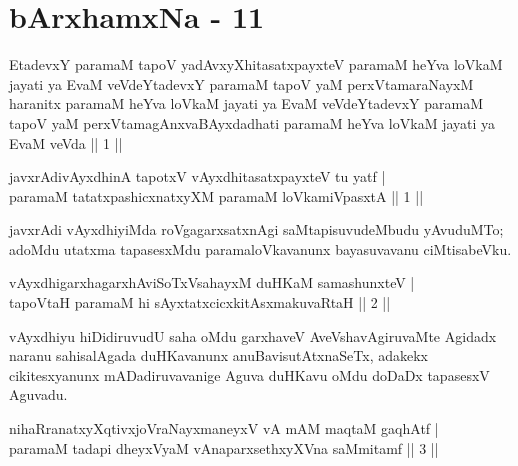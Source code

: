 \chapter{bArxhamxNa - 11}


\begin{kandikeshl}
EtadevxY paramaM tapoV yadAvxyXhitasatxpayxteV paramaM heYva loVkaM jayati ya EvaM veVdeYtadevxY paramaM tapoV yaM perxVtamaraNayxM haranitx paramaM heYva loVkaM jayati ya EvaM veVdeYtadevxY paramaM tapoV yaM perxVtamagAnxvaBAyxdadhati paramaM heYva loVkaM jayati ya EvaM veVda || 1 ||
\end{kandikeshl}



\begin{shl}
javxrAdivAyxdhinA tapotxV vAyxdhitasatxpayxteV tu yatf | \\
paramaM tatatxpashicxnatxyXM paramaM loVkamiVpasxtA \hfill ||  1 ||
\end{shl}

\begin{artha}
javxrAdi vAyxdhiyiMda roVgagarxsatxnAgi saMtapisuvudeMbudu yAvuduMTo; adoMdu utatxma tapasesxMdu paramaloVkavanunx bayasuvavanu ciMtisabeVku.
\end{artha}


\begin{shl}
vAyxdhigarxhagarxhAviSoTxV\s sahayxM duHKaM samashunxteV | \\
tapoV\s taH paramaM hi sAyxtatxcicxkitAsxmakuvaRtaH \hfill ||  2 || 
\end{shl}

\begin{artha}
vAyxdhiyu hiDidiruvudU saha oMdu garxhaveV AveVshavAgiruvaMte Agidadx naranu sahisalAgada duHKavanunx anuBavisutAtxnaSeTx, adakekx cikitesxyanunx mADadiruvavanige Aguva duHKavu oMdu doDaDx tapasesxV Aguvadu.
\end{artha}


\begin{shl}
nihaRranatxyXqtivxjoV\s raNayxmaneyxV vA mAM maqtaM gaqhAtf | \\
paramaM tadapi dheyxVyaM vAnaparxsethxyXVna saMmitamf \hfill ||  3 || 
\end{shl}

